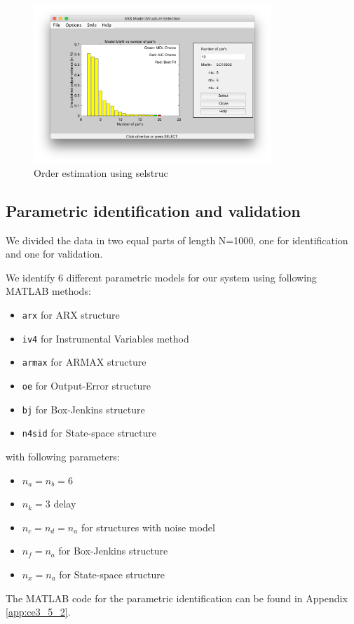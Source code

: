 \documentclass[a4paper,11pt]{article}
\begin{document}
\begin{figure}[H]
\centering
\includegraphics[width=0.8\textwidth]{images/selstruc}
\caption{Order estimation using selstruc}
\label{fig:selstruc}
\end{figure}

\subsection{Parametric identification and validation}

We divided the data in two equal parts of length N=1000, one for identification and one for validation.

We identify 6 different parametric models for our system using following MATLAB methods:
\begin{itemize}
\item \verb'arx' for ARX structure
\item \verb'iv4' for Instrumental Variables method
\item \verb'armax' for ARMAX structure
\item \verb'oe' for Output-Error structure
\item \verb'bj' for Box-Jenkins structure
\item \verb'n4sid' for State-space structure
\end{itemize}

with following parameters: 
\begin{itemize}
\item $n_a = n_b = 6$
\item $n_k = 3$ delay
\item $n_c = n_d = n_a$ for structures with noise model
\item $n_f = n_a$ for Box-Jenkins structure
\item $n_x = n_a$ for State-space structure
\end{itemize}
The MATLAB code for the parametric identification can be found in Appendix \ref{app:ce3_5_2}.
\end{document}
